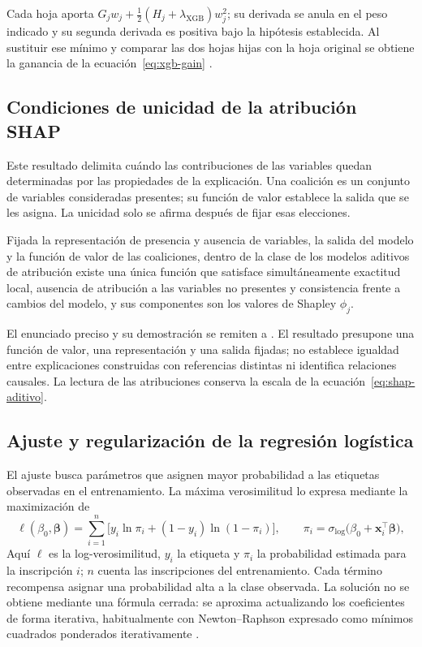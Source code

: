 Cada hoja aporta $G_jw_j+\tfrac12(H_j+\lambda_{\mathrm{XGB}})w_j^2$; su derivada se anula en el peso indicado y su segunda derivada es positiva bajo la hipótesis establecida. Al sustituir ese mínimo y comparar las dos hojas hijas con la hoja original se obtiene la ganancia de la ecuación~\eqref{eq:xgb-gain} \cite{chen2016}. 
\subsection{Condiciones de unicidad de la atribución SHAP}\label{editorial:shap}
Este resultado delimita cuándo las contribuciones de las variables quedan determinadas por las propiedades de la explicación. Una coalición es un conjunto de variables consideradas presentes; su función de valor establece la salida que se les asigna. La unicidad solo se afirma después de fijar esas elecciones.
\begin{teorema}\label{teo:shap}
Fijada la representación de presencia y ausencia de variables, la salida del modelo y la función de valor de las coaliciones, dentro de la clase de los modelos aditivos de atribución existe una única función que satisface simultáneamente exactitud local, ausencia de atribución a las variables no presentes y consistencia frente a cambios del modelo, y sus componentes son los valores de Shapley $\phi_{j}$.
\end{teorema}
El enunciado preciso y su demostración se remiten a \cite{lundberg2017,shapley1953}. El resultado presupone una función de valor, una representación y una salida fijadas; no establece igualdad entre explicaciones construidas con referencias distintas ni identifica relaciones causales. La lectura de las atribuciones conserva la escala de la ecuación~\eqref{eq:shap-aditivo}.

\subsection{Ajuste y regularización de la regresión logística}\label{clara:logistica}
El ajuste busca parámetros que asignen mayor probabilidad a las etiquetas observadas en el entrenamiento. La máxima verosimilitud lo expresa mediante la maximización de
\[
\ell(\beta_0,\boldsymbol{\beta})=\sum_{i=1}^{n}\Big[y_{i}\ln\pi_{i}+(1-y_{i})\ln(1-\pi_{i})\Big],
\qquad
\pi_{i}=\sigma_{\mathrm{log}}\big(\beta_0+\mathbf{x}_{i}^{\top}\boldsymbol{\beta}\big),
\]
Aquí $\ell$ es la log-verosimilitud, $y_i$ la etiqueta y $\pi_i$ la probabilidad estimada para la inscripción $i$; $n$ cuenta las inscripciones del entrenamiento. Cada término recompensa asignar una probabilidad alta a la clase observada. La solución no se obtiene mediante una fórmula cerrada: se aproxima actualizando los coeficientes de forma iterativa, habitualmente con Newton--Raphson expresado como mínimos cuadrados ponderados iterativamente \cite{hosmer2013,james2023}.

